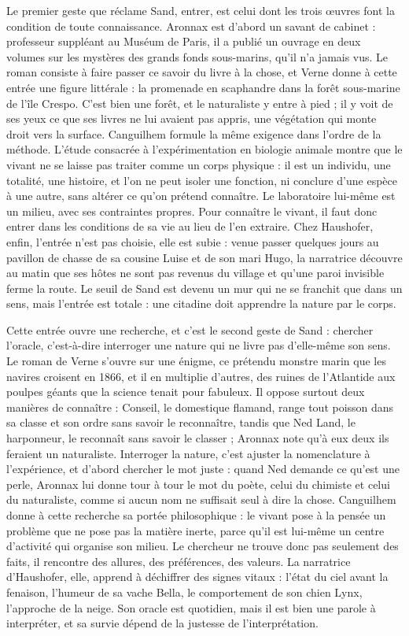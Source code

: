 \documentclass[11pt,a4paper]{article}
\begin{document}
Le premier geste que réclame Sand, entrer, est celui dont les trois œuvres font la condition de toute connaissance. Aronnax est d'abord un savant de cabinet : professeur suppléant au Muséum de Paris, il a publié un ouvrage en deux volumes sur les mystères des grands fonds sous-marins, qu'il n'a jamais vus. Le roman consiste à faire passer ce savoir du livre à la chose, et Verne donne à cette entrée une figure littérale : la promenade en scaphandre dans la forêt sous-marine de l'île Crespo. C'est bien une forêt, et le naturaliste y entre à pied ; il y voit de ses yeux ce que ses livres ne lui avaient pas appris, une végétation qui monte droit vers la surface. Canguilhem formule la même exigence dans l'ordre de la méthode. L'étude consacrée à l'expérimentation en biologie animale montre que le vivant ne se laisse pas traiter comme un corps physique : il est un individu, une totalité, une histoire, et l'on ne peut isoler une fonction, ni conclure d'une espèce à une autre, sans altérer ce qu'on prétend connaître. Le laboratoire lui-même est un milieu, avec ses contraintes propres. Pour connaître le vivant, il faut donc entrer dans les conditions de sa vie au lieu de l'en extraire. Chez Haushofer, enfin, l'entrée n'est pas choisie, elle est subie : venue passer quelques jours au pavillon de chasse de sa cousine Luise et de son mari Hugo, la narratrice découvre au matin que ses hôtes ne sont pas revenus du village et qu'une paroi invisible ferme la route. Le seuil de Sand est devenu un mur qui ne se franchit que dans un sens, mais l'entrée est totale : une citadine doit apprendre la nature par le corps.

Cette entrée ouvre une recherche, et c'est le second geste de Sand : chercher l'oracle, c'est-à-dire interroger une nature qui ne livre pas d'elle-même son sens. Le roman de Verne s'ouvre sur une énigme, ce prétendu monstre marin que les navires croisent en 1866, et il en multiplie d'autres, des ruines de l'Atlantide aux poulpes géants que la science tenait pour fabuleux. Il oppose surtout deux manières de connaître : Conseil, le domestique flamand, range tout poisson dans sa classe et son ordre sans savoir le reconnaître, tandis que Ned Land, le harponneur, le reconnaît sans savoir le classer ; Aronnax note qu'à eux deux ils feraient un naturaliste. Interroger la nature, c'est ajuster la nomenclature à l'expérience, et d'abord chercher le mot juste : quand Ned demande ce qu'est une perle, Aronnax lui donne tour à tour le mot du poète, celui du chimiste et celui du naturaliste, comme si aucun nom ne suffisait seul à dire la chose. Canguilhem donne à cette recherche sa portée philosophique : le vivant pose à la pensée un problème que ne pose pas la matière inerte, parce qu'il est lui-même un centre d'activité qui organise son milieu. Le chercheur ne trouve donc pas seulement des faits, il rencontre des allures, des préférences, des valeurs. La narratrice d'Haushofer, elle, apprend à déchiffrer des signes vitaux : l'état du ciel avant la fenaison, l'humeur de sa vache Bella, le comportement de son chien Lynx, l'approche de la neige. Son oracle est quotidien, mais il est bien une parole à interpréter, et sa survie dépend de la justesse de l'interprétation.
\end{document}
